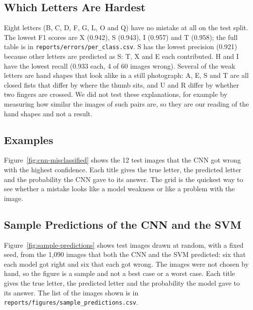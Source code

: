 \subsection{Which Letters Are Hardest}

Eight letters (B, C, D, F, G, L, O and Q) have no mistake at all on the test split. The lowest F1 scores are X (0.942), S (0.943), I (0.957) and T (0.958); the full table is in \texttt{reports/errors/\allowbreak per\_class.csv}. S has the lowest precision (0.921) because other letters are predicted as S: T, X and E each contributed. H and I have the lowest recall (0.933 each, 4 of 60 images wrong). Several of the weak letters are hand shapes that look alike in a still photograph: A, E, S and T are all closed fists that differ by where the thumb sits, and U and R differ by whether two fingers are crossed. We did not test these explanations, for example by measuring how similar the images of such pairs are, so they are our reading of the hand shapes and not a result.

\subsection{Examples}

Figure~\ref{fig:cnn-misclassified} shows the 12 test images that the CNN got wrong with the highest confidence. Each title gives the true letter, the predicted letter and the probability the CNN gave to its answer. The grid is the quickest way to see whether a mistake looks like a model weakness or like a problem with the image.


\subsection{Sample Predictions of the CNN and the SVM}

Figure~\ref{fig:sample-predictions} shows test images drawn at random, with a fixed seed, from the 1{,}090 images that both the CNN and the SVM predicted: six that each model got right and six that each got wrong. The images were not chosen by hand, so the figure is a sample and not a best case or a worst case. Each title gives the true letter, the predicted letter and the probability the model gave to its answer. The list of the images shown is in \texttt{reports/figures/sample\_predictions.csv}.

